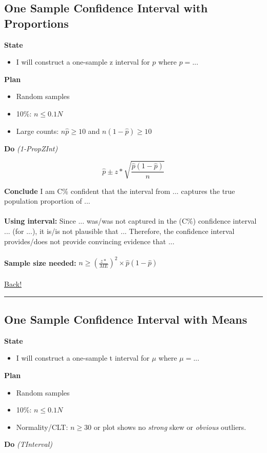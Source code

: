 \documentclass[main]{subfiles}
\begin{document}

\subsection{One Sample Confidence Interval with Proportions}
\textbf{State}
\begin{itemize}
    \item I will construct a one-sample z interval for $p$ where $p = ...$
\end{itemize}
\textbf{Plan}
\begin{itemize}
    \item Random samples
    \item 10\%: $n \leq 0.1N$
    \item Large counts: $n\hat{p} \geq 10$ and $n(1-\hat{p}) \geq 10$
\end{itemize}
\textbf{Do} \textit{(1-PropZInt)}

\[\hat{p} \pm z* \sqrt{\frac{\hat{p}(1-\hat{p})}{n}}\]

\noindent\textbf{Conclude}
I am C\% confident that the interval from ... captures the true population proportion of ...
\\~\\
\noindent\textbf{Using interval:} Since ... was/was not captured in the (C\%) confidence interval ... (for ...), it is/is not plausible that ... Therefore, the confidence interval provides/does not provide convincing evidence that ...
\\~\\
\noindent\textbf{Sample size needed:} $n \geq (\frac{z*}{{ME}})^2 \times \hat{p}(1-\hat{p})$
\\~\\
\noindent\hyperlink{toc}{Back!}
\newline\hrule


\subsection{One Sample Confidence Interval with Means}
\textbf{State}
\begin{itemize}
    \item I will construct a one-sample t interval for $\mu$ where $\mu = ...$
\end{itemize}
\textbf{Plan}
\begin{itemize}
    \item Random samples
    \item 10\%: $n \leq 0.1N$
    \item Normality/CLT: $n \geq 30$ or plot shows no \textit{strong} skew or \textit{obvious} outliers.
\end{itemize}
\textbf{Do} \textit{(TInterval)}
\end{document}
